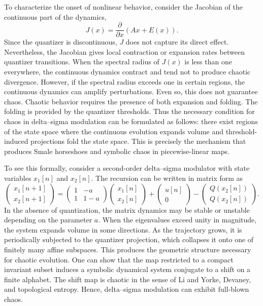 To characterize the onset of nonlinear behavior, consider the Jacobian of the continuous part of the dynamics,
\[
J(x) = \frac{\partial}{\partial x} \left( A x + E(x) \right).
\]
Since the quantizer is discontinuous, \(J\) does not capture its direct effect. Nevertheless, the Jacobian gives local contraction or expansion rates between quantizer transitions. When the spectral radius of \(J(x)\) is less than one everywhere, the continuous dynamics contract and tend not to produce chaotic divergence. However, if the spectral radius exceeds one in certain regions, the continuous dynamics can amplify perturbations. Even so, this does not guarantee chaos. Chaotic behavior requires the presence of both expansion and folding. The folding is provided by the quantizer thresholds. Thus the necessary condition for chaos in delta–sigma modulation can be formulated as follows: there exist regions of the state space where the continuous evolution expands volume and threshold-induced projections fold the state space. This is precisely the mechanism that produces Smale horseshoes and symbolic chaos in piecewise-linear maps.

To see this formally, consider a second-order delta–sigma modulator with state variables \(x_1[n]\) and \(x_2[n]\). The recursion can be written in matrix form as
\[
\begin{pmatrix}
x_1[n+1] \\ x_2[n+1]
\end{pmatrix}
=
\begin{pmatrix}
1 & -a \\ 1 & 1 - a
\end{pmatrix}
\begin{pmatrix}
x_1[n] \\ x_2[n]
\end{pmatrix}
+
\begin{pmatrix}
u[n] \\ 0
\end{pmatrix}
-
\begin{pmatrix}
Q(x_2[n]) \\ Q(x_2[n])
\end{pmatrix}.
\]
In the absence of quantization, the matrix dynamics may be stable or unstable depending on the parameter \(a\). When the eigenvalues exceed unity in magnitude, the system expands volume in some directions. As the trajectory grows, it is periodically subjected to the quantizer projection, which collapses it onto one of finitely many affine subspaces. This produces the geometric structure necessary for chaotic evolution. One can show that the map restricted to a compact invariant subset induces a symbolic dynamical system conjugate to a shift on a finite alphabet. The shift map is chaotic in the sense of Li and Yorke, Devaney, and topological entropy. Hence, delta–sigma modulation can exhibit full-blown chaos.

